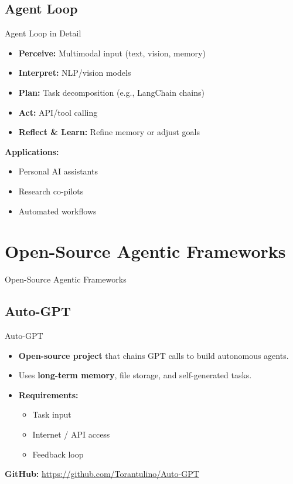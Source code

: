 \subsection{Agent Loop}
\begin{frame}[allowframebreaks]{Agent Loop in Detail}
    \begin{itemize}
        \item \textbf{Perceive:} Multimodal input (text, vision, memory)
        \item \textbf{Interpret:} NLP/vision models
        \item \textbf{Plan:} Task decomposition (e.g., LangChain chains)
        \item \textbf{Act:} API/tool calling
        \item \textbf{Reflect \& Learn:} Refine memory or adjust goals
    \end{itemize}
    \vspace{1em}
    \textbf{Applications:}
    \begin{itemize}
        \item Personal AI assistants
        \item Research co-pilots
        \item Automated workflows
    \end{itemize}
\end{frame}


\section{Open-Source Agentic Frameworks}
\begin{frame}{}
    \LARGE Open-Source Agentic Frameworks
\end{frame}


\subsection{Auto-GPT}
\begin{frame}[allowframebreaks]{Auto-GPT}
    \begin{itemize}
        \item \textbf{Open-source project} that chains GPT calls to build autonomous agents.
        \item Uses \textbf{long-term memory}, file storage, and self-generated tasks.
        \item \textbf{Requirements:}
        \begin{itemize}
            \item Task input
            \item Internet / API access
            \item Feedback loop
        \end{itemize}
    \end{itemize}
    \vspace{0.5em}
    \textbf{GitHub:} \href{https://github.com/Torantulino/Auto-GPT}{https://github.com/Torantulino/Auto-GPT}
\end{frame}



